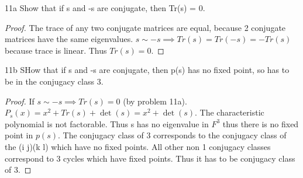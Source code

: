 \documentclass{article}
\begin{document}
\bigskip

\begin{PROB}{11a}\label{Problem 11a.}
    Show that if s and -s are conjugate, then Tr(s) = 0.
\end{PROB}
\begin{proof}
    The trace of any two conjugate matrices are equal, because 2 conjugate matrices have the same eigenvalues.
    $s \sim -s \implies Tr(s) = Tr(-s) = -Tr(s)$ because trace is linear. Thus $Tr(s) = 0$.
\end{proof}

\begin{PROB}{11b}\label{Problem 11b.}
    SHow that if s and -s are conjugate, then p(s) has no fixed point, so has to be in the conjugacy class 3. 
\end{PROB}
\begin{proof}
    If $s \sim -s \implies Tr(s) = 0$ (by problem 11a). $P_s(x) = x^2 + Tr(s) + \det(s) = x^2 + \det(s)$. The characteristic polynomial is not factorable. Thus s has no eigenvalue in $F^3$ thus there is no fixed point in $p(s)$. The conjugacy class of 3 corresponds to the conjugacy class of the (i j)(k l) which have no fixed points. All other non 1 conjugacy classes correspond to 3 cycles which have fixed points. Thus it has to be conjugacy class of 3. 
\end{proof}
\end{document}
